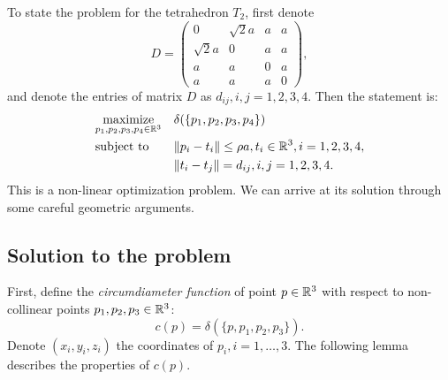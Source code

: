 \noindent To state the problem for the tetrahedron $T_2$, first denote 
$$D = \begin{pmatrix}
0 & \sqrt 2  a & a & a \\
\sqrt 2 a & 0 & a & a \\
a & a & 0 & a\\
a & a & a & 0
\end{pmatrix},
$$
and denote the entries of matrix $D$ as $d_{ij}, i,j=1,2,3,4$. Then the statement is:
\begin{equation}\label{prob:tetra2}
\begin{aligned}
& \underset{p_1,p_2,p_3,p_4\in {\mathbb R^3}}{\text{maximize}}
& & \delta(\{p_1,p_2,p_3,p_4\}) \\
& \text{subject to}
& & \|p_i - t_i\| \leq \rho a, t_i\in {\mathbb R^3}, i=1,2,3,4, \\
& & & \|t_i-t_j\| = d_{ij}, i,j=1,2,3,4.\\
\end{aligned}
\end{equation}
This is a non-linear optimization problem. We can arrive at its solution through some careful geometric arguments.

\subsection{Solution to the problem}
First, define the \textit{circumdiameter function} of point $p \in {\mathbb R^3}$ with respect to non-collinear points $p_1,p_2,p_3 \in {\mathbb R^3}$:
$$c(p) = \delta(\{p,p_1,p_2,p_3\}).$$
Denote $(x_i,y_i,z_i)$ the coordinates of $p_i, i=1,\dots,3$. The following lemma describes the properties of $c(p)$.

